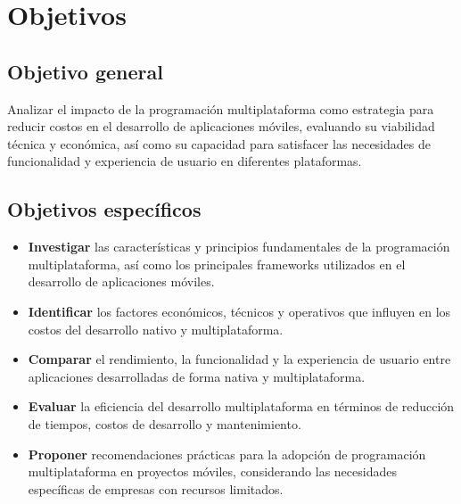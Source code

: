 \newpage
\section{Objetivos}

\subsection{Objetivo general}
Analizar el impacto de la programación multiplataforma como estrategia
para reducir costos en el desarrollo de aplicaciones móviles, evaluando
su viabilidad técnica y económica, así como su capacidad para satisfacer
las necesidades de funcionalidad y experiencia de usuario en diferentes
plataformas.

\subsection{Objetivos específicos}
\begin{itemize}
    \item \textbf{Investigar} las características y principios fundamentales de la programación multiplataforma, así como los principales frameworks utilizados en el desarrollo de aplicaciones móviles.
    \item \textbf{Identificar} los factores económicos, técnicos y operativos que influyen en los costos del desarrollo nativo y multiplataforma.
    \item \textbf{Comparar} el rendimiento, la funcionalidad y la experiencia de usuario entre aplicaciones desarrolladas de forma nativa y multiplataforma.
    \item \textbf{Evaluar} la eficiencia del desarrollo multiplataforma en términos de reducción de tiempos, costos de desarrollo y mantenimiento.
    \item \textbf{Proponer} recomendaciones prácticas para la adopción de programación multiplataforma en proyectos móviles, considerando las necesidades específicas de empresas con recursos limitados.
\end{itemize}